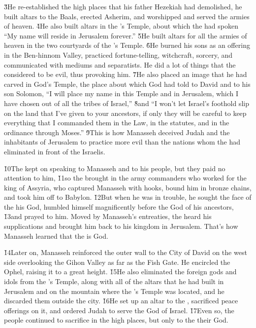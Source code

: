 \v{3}He re-established the high places that his father Hezekiah had demolished, he built altars to the Baals, erected Asherim, and worshipped and served the armies of heaven. \v{4}He also built altars in the 's Temple, about which the  had spoken ``My name will reside in Jerusalem forever.'' \v{5}He built altars for all the armies of heaven in the two courtyards of the 's Temple. \v{6}He burned his sons as an offering in the Ben-hinnom Valley, practiced fortune-telling, witchcraft, sorcery, and communicated with mediums and separatists. He did a lot of things that the  considered to be evil, thus provoking him. \v{7}He also placed an image that he had carved in God's Temple, the place about which God had told to David and to his son Solomon, ``I will place my name in this Temple and in Jerusalem, which I have chosen out of all the tribes of Israel,'' \v{8}and ``I won't let Israel's foothold slip on the land that I've given to your ancestors, if only they will be careful to keep everything that I commanded them in the Law, in the statutes, and in the ordinance through Moses.'' \v{9}This is how Manasseh deceived Judah and the inhabitants of Jerusalem to practice more evil than the nations whom the  had eliminated in front of the Israelis.

\v{10}The  kept on speaking to Manasseh and to his people, but they paid no attention to him, \v{11}so the  brought in the army commanders who worked for the king of Assyria, who captured Manasseh with hooks, bound him in bronze chains, and took him off to Babylon. \v{12}But when he was in trouble, he sought the face of the  his God, humbled himself magnificently before the God of his ancestors, \v{13}and prayed to him. Moved by Manasseh's entreaties, the  heard his supplications and brought him back to his kingdom in Jerusalem. That's how Manasseh learned that the  is God.

\v{14}Later on, Manasseh reinforced the outer wall to the City of David on the west side overlooking the Gihon Valley as far as the Fish Gate. He encircled the Ophel, raising it to a great height. \v{15}He also eliminated the foreign gods and idols from the 's Temple, along with all of the altars that he had built in Jerusalem and on the mountain where the 's Temple was located, and he discarded them outside the city. \v{16}He set up an altar to the , sacrificed peace offerings on it, and ordered Judah to serve the  God of Israel. \v{17}Even so, the people continued to sacrifice in the high places, but only to the  their God.

